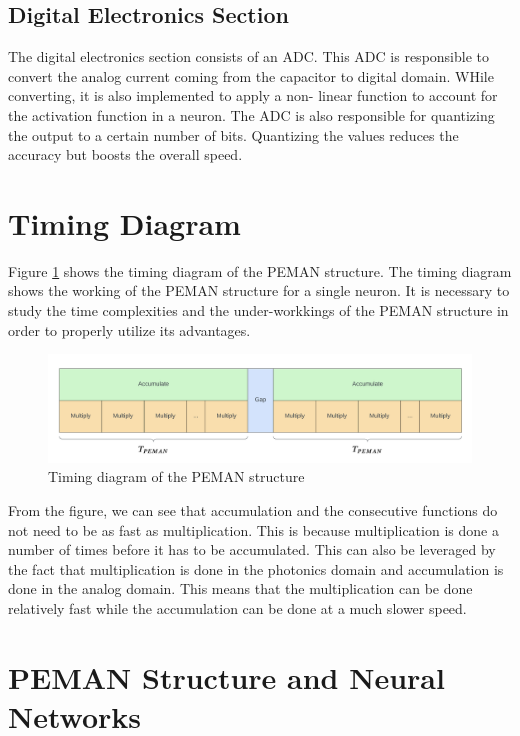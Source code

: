 \subsection{Digital Electronics Section}

The digital electronics section consists of an ADC. This ADC is responsible to convert the analog current coming from the capacitor to digital domain. WHile converting, it is also implemented to apply a non- linear function to account for the activation function in a neuron. The ADC is also responsible for quantizing the output to a certain number of bits. Quantizing the values reduces the accuracy but boosts the overall speed.

\section{Timing Diagram}

Figure \ref{timing} shows the timing diagram of the PEMAN structure. The timing diagram shows the working of the PEMAN structure for a single neuron. It is necessary to study the time complexities and the under-workkings of the PEMAN structure in order to properly utilize its advantages.

\begin{figure}
	\centering
	\includegraphics[width=\textwidth]{images/timing.png}
	\caption{Timing diagram of the PEMAN structure}
	\label{timing}
\end{figure}

From the figure, we can see that accumulation and the consecutive functions do not need to be as fast as multiplication. This is because multiplication is done a number of times before it has to be accumulated. This can also be leveraged by the fact that multiplication is done in the photonics domain and accumulation is done in the analog domain. This means that the multiplication can be done relatively fast while the accumulation can be done at a much slower speed.

\section{PEMAN Structure and Neural Networks}

